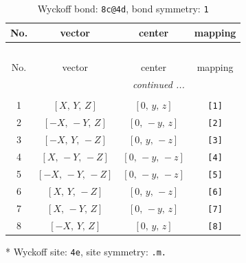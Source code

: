 \documentclass[fleqn,8pt]{jsarticle}
\begin{document}
\renewcommand{\arraystretch}{1.2}
\begin{longtable}{cccc}
\caption{Wyckoff bond: {\tt 8c@4d}, bond symmetry: {\tt 1}}
 \\
 \hline \hline
No. & vector & center & mapping \\ \hline \endfirsthead

\multicolumn{3}{l}{\tablename\ \thetable{}} \\
 \hline \hline
No. & vector & center & mapping \\ \hline \endhead

 \hline \hline
\multicolumn{3}{r}{\footnotesize\it continued ...} \\ \endfoot

 \hline \hline
\multicolumn{3}{r}{} \\ \endlastfoot

1 & $\left[ X,\, Y,\, Z \right]$ & $\left[ 0,\, y,\, z \right]$ & {\tt [1]} \\ \hline
2 & $\left[ - X,\, - Y,\, Z \right]$ & $\left[ 0,\, - y,\, z \right]$ & {\tt [2]} \\ \hline
3 & $\left[ - X,\, Y,\, - Z \right]$ & $\left[ 0,\, y,\, - z \right]$ & {\tt [3]} \\ \hline
4 & $\left[ X,\, - Y,\, - Z \right]$ & $\left[ 0,\, - y,\, - z \right]$ & {\tt [4]} \\ \hline
5 & $\left[ - X,\, - Y,\, - Z \right]$ & $\left[ 0,\, - y,\, - z \right]$ & {\tt [5]} \\ \hline
6 & $\left[ X,\, Y,\, - Z \right]$ & $\left[ 0,\, y,\, - z \right]$ & {\tt [6]} \\ \hline
7 & $\left[ X,\, - Y,\, Z \right]$ & $\left[ 0,\, - y,\, z \right]$ & {\tt [7]} \\ \hline
8 & $\left[ - X,\, Y,\, Z \right]$ & $\left[ 0,\, y,\, z \right]$ & {\tt [8]} \\
\end{longtable}
* Wyckoff site: {\tt 4e}, site symmetry: {\tt .m.}
\renewcommand{\arraystretch}{1.2}
\end{document}
